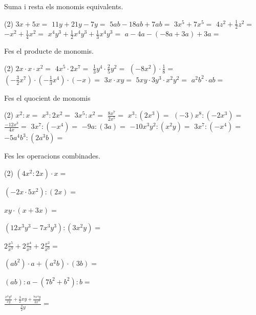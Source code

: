 \begin{mylist}

\exer \spen Suma i resta els monomis equivalents.
\begin{tasks}(2)
\task $3x+5x =$ 
\task $11y+21y-7y =$ 
\task $5ab-18ab+7ab=$ 
\task $3x^5+7x^5=$
\task $4z^2+\frac{1}{2}z^2=$
\task $-x^2+\frac{1}{4}x^2=$
\task $x^4y^3+ \frac{1}{2}x^4y^3+\frac{1}{3}x^4y^3=$
\task $a-4a-(-8a+3a)+3a=$
\end{tasks}


\exer \spen Fes el producte de monomis.
\begin{tasks}(2)
	\task $2x\cdot x \cdot x^2=$ 
	\task $4x^5\cdot 2x^7 =$ 
	\task $ \frac{1}{3}y^4 \cdot \frac{2}{5}y^2 =$
	\task $(-8x^2)\cdot \frac{1}{8}=$
	\task $(-\frac{3}{2}x^7)\cdot(-\frac{1}{3}x^4)\cdot (-x)=$
	\task $3x \cdot xy=$
	\task $5xy \cdot 3y^3 \cdot x^2y^2=$
	\task $a^2b^2 \cdot ab=$
\end{tasks}


\newpage
\exer \spen Fes el quocient de monomis
 \begin{tasks}(2)
	\task $x^2:x=$
\task $x^3:2x^2=$
\task $3x^5:x^2=$
\task $\frac{8x^7}{2x^5}=$
\task $x^3:(2x^3)=$
\task $(-3)x^8:(-2x^3)=$
\task $\frac{-12x^3}{4x}=$
\task $3x^7:(-x^4)=$
\task $-9a:(3a)=$
\task $-10x^3y^2:(x^2y)=$
\task $3x^7:(-x^4)=$
\task $-5a^4b^3:(2a^3b)=$
\end{tasks}


\exer \spen Fes les operacions combinades. 
 \begin{tasks}(2)
	\task $(4x^2:2x)\cdot x=$
	
\task $(-2x\cdot 5x^2):(2x)=$

\task $xy\cdot (x+3x)=$

\task $(12 x^3y^3 -7x^3y^3): (3x^2y)=$

\task $2\frac{x^5}{x^3}+ 2 \frac{x^4}{x^2} + 2 \frac{x^2}{x^0}=$

\task $(ab^2)\cdot a + (a^2 b)\cdot (3b)=$

\task $(ab):a - (7b^2+b^2):b=$

\task $\frac{\frac{x^2y^2}{xy}+\frac{3}{2}xy+\frac{7x^4y}{3x^3}}{\frac{3}{2}y}=$
 \end{tasks}


\end{mylist}


